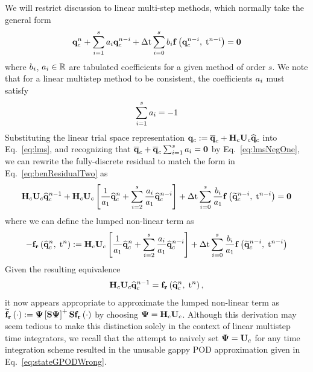 We will restrict discussion to linear multi-step methods, which normally take the general form
%
\begin{equation}\label{eq:lms}
	\mathbf{q}_{c}^{n} + \sum_{i=1}^{s} a_{i} \mathbf{q}_{c}^{n-i} + \Delta \text{t} \sum_{i=0}^{s} b_{i} \mathbf{f} \left(\mathbf{q}_{c}^{n-i}, \; \text{t}^{n-i}\right) = \mathbf{0}
\end{equation}
%
where $b_{i}$, $a_{i} \in \mathbb{R}$ are tabulated coefficients for a given method of order $s$. We note that for a linear multistep method to be consistent, the coefficients $a_{i}$ must satisfy
%
\begin{equation}\label{eq:lmsNegOne}
	\sum_{i=1}^{s} a_{i} = -1
\end{equation}
%
Substituting the linear trial space representation $\consVec \defEq \consVecCent + \consScale \consTrial \consVecCoef$ into Eq.~\ref{eq:lms}, and recognizing that $\mathbf{\overline{q}}_{c} + \mathbf{\overline{q}}_{c} \sum_{i=1}^{s} a_{i} = \mathbf{0}$ by Eq.~\ref{eq:lmsNegOne}, we can rewrite the fully-discrete residual to match the form in Eq.~\ref{eq:benResidualTwo} as
%
\begin{equation}
	\consScale \consTrial \consVecCoef^{\timeIdx-1} + \consScale \consTrial \left[\frac{1}{a_1} \consVecCoef^{\timeIdx} + \sum_{\dummyIdx=2}^{s} \frac{a_{\dummyIdx}}{a_1} \consVecCoef^{\timeIdx-\dummyIdx}\right] + \dt \sum_{\dummyIdx=0}^{s} \frac{b_{\dummyIdx}}{a_1} \rhsFunc{\consVecRom^{\timeIdx-\dummyIdx}, \; \timeVar^{\timeIdx-\dummyIdx}} = \zeroVec
\end{equation}
%
where we can define the lumped non-linear term as
%
\begin{equation}
	-\rhsResFunc{\consVecCoef^{\timeIdx},\; \timeVar^{\timeIdx}} \defEq \consScale \consTrial \left[\frac{1}{a_1} \consVecCoef^{\timeIdx} + \sum_{\dummyIdx=2}^{s} \frac{a_{\dummyIdx}}{a_1} \consVecCoef^{\timeIdx-\dummyIdx}\right] + \dt \sum_{\dummyIdx=0}^{s} \frac{b_{\dummyIdx}}{a_1} \rhsFunc{\consVecRom^{\timeIdx-\dummyIdx}, \; \timeVar^{\timeIdx-\dummyIdx}}
\end{equation}
%
Given the resulting equivalence
%
\begin{equation}
	\consScale \consTrial \consVecCoef^{\timeIdx-1} = \rhsResFunc{\consVecCoef^{\timeIdx},\; \timeVar^{\timeIdx}},
\end{equation}
%
it now appears appropriate to approximate the lumped non-linear term as $\rhsResApproxFunc{\cdot} \defEq \deimBasis \left[\sampMat \deimBasis\right]^+ \sampMat \rhsResFunc{\cdot}$ by choosing $\deimBasis = \consScale \consTrial$. Although this derivation may seem tedious to make this distinction solely in the context of linear multistep time integrators, we recall that the attempt to naively set $\deimBasis = \consTrial$ for any time integration scheme resulted in the unusable gappy POD approximation given in Eq.~\ref{eq:stateGPODWrong}.

